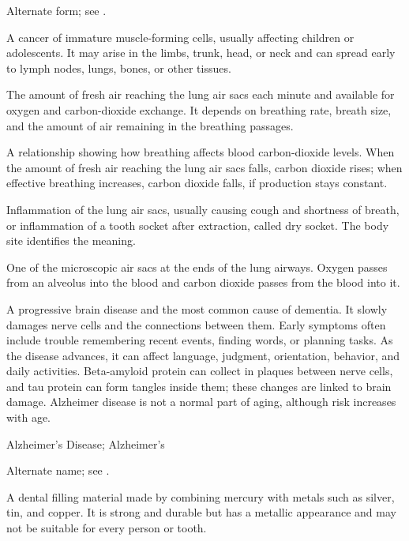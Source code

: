  Alternate form; see .

 A cancer of immature muscle-forming cells, usually affecting children or adolescents. It may arise in the limbs, trunk, head, or neck and can spread early to lymph nodes, lungs, bones, or other tissues.

 The amount of fresh air reaching the lung air sacs each minute and available for oxygen and carbon-dioxide exchange. It depends on breathing rate, breath size, and the amount of air remaining in the breathing passages.

 A relationship showing how breathing affects blood carbon-dioxide levels. When the amount of fresh air reaching the lung air sacs falls, carbon dioxide rises; when effective breathing increases, carbon dioxide falls, if production stays constant.

 Inflammation of the lung air sacs, usually causing cough and shortness of breath, or inflammation of a tooth socket after extraction, called dry socket. The body site identifies the meaning.

 One of the microscopic air sacs at the ends of the lung airways. Oxygen passes from an alveolus into the blood and carbon dioxide passes from the blood into it.

 A progressive brain disease and the most common cause of dementia. It slowly damages nerve cells and the connections between them. Early symptoms often include trouble remembering recent events, finding words, or planning tasks. As the disease advances, it can affect language, judgment, orientation, behavior, and daily activities. Beta-amyloid protein can collect in plaques between nerve cells, and tau protein can form tangles inside them; these changes are linked to brain damage. Alzheimer disease is not a normal part of aging, although risk increases with age.

\synonyms
Alzheimer's Disease; Alzheimer's

 Alternate name; see .

 A dental filling material made by combining mercury with metals such as silver, tin, and copper. It is strong and durable but has a metallic appearance and may not be suitable for every person or tooth.

